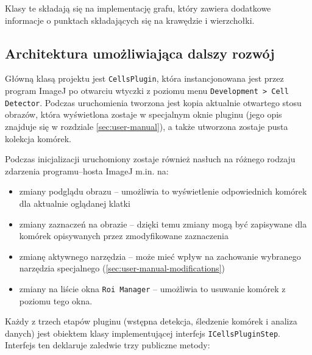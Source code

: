 \documentclass[declaration,shortabstract,mgr]{iithesis}
\begin{document}
Klasy te składają się na implementację grafu, który zawiera dodatkowe informacje o punktach składających się na krawędzie i wierzchołki.

\subsection{Architektura umożliwiająca dalszy rozwój}
\label{sec:architecture}

Główną klasą projektu jest \texttt{CellsPlugin}, która instancjonowana jest przez program ImageJ po otwarciu wtyczki z poziomu menu \texttt{Development > Cell Detector}.
Podczas uruchomienia tworzona jest kopia aktualnie otwartego stosu obrazów, która wyświetlona zostaje w specjalnym oknie pluginu (jego opis znajduje się w rozdziale \ref{sec:user-manual}), a także utworzona zostaje pusta kolekcja komórek.

Podczas inicjalizacji uruchomiony zostaje również nasłuch na różnego rodzaju zdarzenia programu--hosta ImageJ m.in. na:
\begin{itemize}
  \item zmiany podglądu obrazu -- umożliwia to wyświetlenie odpowiednich komórek dla aktualnie oglądanej klatki
  \item zmiany zaznaczeń na obrazie -- dzięki temu zmiany mogą być zapisywane dla komórek opisywanych przez zmodyfikowane zaznaczenia
  \item zmianę aktywnego narzędzia -- może mieć wpływ na zachowanie wybranego narzędzia specjalnego (\ref{sec:user-manual-modifications})
  \item zmiany na liście okna \texttt{Roi Manager} -- umożliwia to usuwanie komórek z poziomu tego okna.
\end{itemize}

Każdy z trzech etapów pluginu (wstępna detekcja, śledzenie komórek i analiza danych) jest obiektem klasy implementującej interfejs \texttt{ICellsPluginStep}.
Interfejs ten deklaruje zaledwie trzy publiczne metody:
\end{document}
